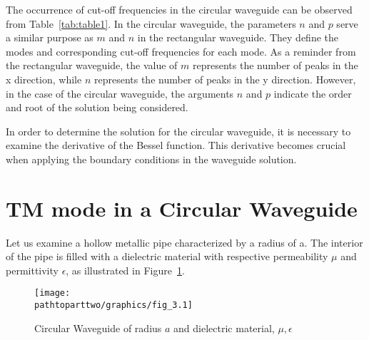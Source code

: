 The occurrence of cut-off frequencies in the circular waveguide can be observed from Table~\ref{tab:table1}. In the circular waveguide, the parameters $n$ and $p$ serve a similar purpose as $m$ and $n$ in the rectangular waveguide. They define the modes and corresponding cut-off frequencies for each mode. As a reminder from the rectangular waveguide, the value of 
$m$ represents the number of peaks in the x direction, while $n$ represents the number of peaks in the y direction. However, in the case of the circular waveguide, the arguments $n$ and $p$ indicate the order and root of the solution being considered.

In order to determine the solution for the circular waveguide, it is necessary to examine the derivative of the Bessel function. This derivative becomes crucial when applying the boundary conditions in the waveguide solution.

\section{TM mode in a Circular Waveguide}
Let us examine a hollow metallic pipe characterized by a radius of a. The interior of the pipe is filled with a dielectric material with respective permeability $\mu$ and permittivity $\epsilon$, as illustrated in Figure~\ref{fig:fig3}.
\begin{figure}[h]
\centering
\texttt{[image: \\pathtoparttwo/graphics/fig\_3.1]}
\caption{Circular Waveguide of radius $a$ and dielectric material, $\mu, \epsilon$}
\label{fig:fig3}
\end{figure}


